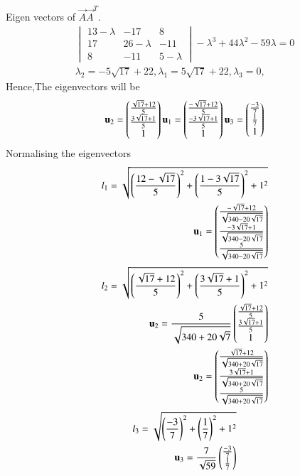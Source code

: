 \documentclass[journal,12pt,twocolumn]{IEEEtran}
\begin{document}
Eigen vectors of $\vec{A}$$\vec{A}^T.$
\begin{align}
\begin{vmatrix}
13-\lambda&-17&8\\17&26-\lambda&-11\\8&-11&5-\lambda
\end{vmatrix}
-\lambda^3+44\lambda^2-59\lambda=0\\
\lambda_2=-5\sqrt{17}+22,\lambda_1=5\sqrt{17}+22,\lambda_3=0,
\end{align}
Hence,The eigenvectors will be
\begin{align}
\mathbf{u}_2=\begin{pmatrix}\frac{\sqrt{17}+12}{5}\\\frac{3\sqrt{17}+1}{5}\\1\end{pmatrix}
\mathbf{u}_1=\begin{pmatrix}\frac{-\sqrt{17}+12}{5}\\\frac{-3\sqrt{17}+1}{5}\\1\end{pmatrix}
\mathbf{u}_3=\begin{pmatrix}\frac{-3}{7}\\\frac{1}{7}\\1\end{pmatrix}
\end{align}
Normalising the eigenvectors
\begin{align}
l_1=\sqrt{{\left(\frac{12-\sqrt{17}}{5}\right)}^2+{\left(\frac{1-3\sqrt{17}}{5}\right)}^2+1^2}\\
\mathbf{u}_1=\begin{pmatrix}\frac{-\sqrt{17}+12}{\sqrt{340-20\sqrt{17}}}\\\frac{-3\sqrt{17}+1}{\sqrt{340-20\sqrt{17}}}\\\frac{5}{\sqrt{340-20\sqrt{17}}}\end{pmatrix}\\
\end{align}
\begin{align}
l_2=\sqrt{\left({\frac{\sqrt{17}+12}{5}}\right)^2+\left({\frac{3\sqrt{17}+1}{5}}\right)^2+1^2}\\
\mathbf{u}_2=\frac{5}{\sqrt{340+20\sqrt{7}}}\begin{pmatrix}\frac{\sqrt{17}+12}{5}\\\frac{3\sqrt{17}+1}{5}\\1\end{pmatrix}\\
\mathbf{u}_2=\begin{pmatrix}\frac{\sqrt{17}+12}{\sqrt{340+20\sqrt{17}}}\\\frac{3\sqrt{17}+1}{\sqrt{340+20\sqrt{17}}}\\\frac{5}{\sqrt{340+20\sqrt{17}}}\end{pmatrix}
\end{align}
\begin{align}
l_3=\sqrt{\left({\frac{-3}{7}}\right)^2+\left({\frac{1}{7}}\right)^2+1^2}\\
\vec{u}_3=\frac{7}{\sqrt{59}}\myvec{\frac{-3}{7}\\\frac{1}{7}}\\

\end{align}$$
\end{document}
